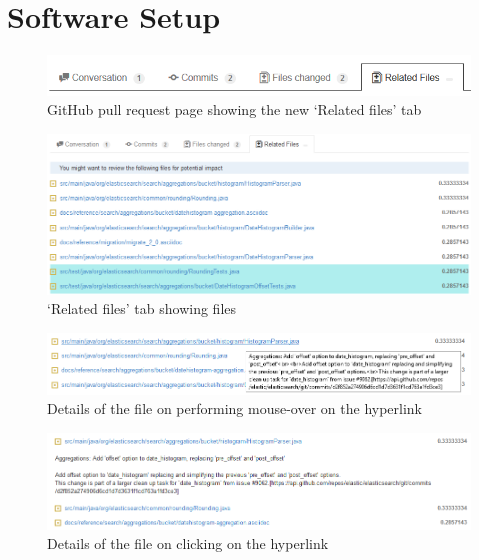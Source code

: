 
\section{Software Setup}
\label{sec:setup}

\begin{figure}[ht!]
\centering
\includegraphics[width=16cm]{NewTabRelatedFiles}
\caption{GitHub pull request page showing the new `Related files' tab}
\label{fig:newTabRelated}
\end{figure}

\begin{figure}[ht!]
\centering
\includegraphics[width=16cm]{RelatedFilesContents}
\caption{`Related files' tab showing files}
\label{fig:relatedFilesContents}
\end{figure}

\begin{figure}[ht!]
\centering
\includegraphics[width=16cm]{MouseOverOfFile}
\caption{Details of the file on performing mouse-over on the hyperlink}
\label{fig:mouseOverOnFile}
\end{figure}

\begin{figure}[ht!]
\centering
\includegraphics[width=16cm]{ClickOfFileHyperlink}
\caption{Details of the file on clicking on the hyperlink}
\label{fig:clickOnFileHyperlink}
\end{figure}

